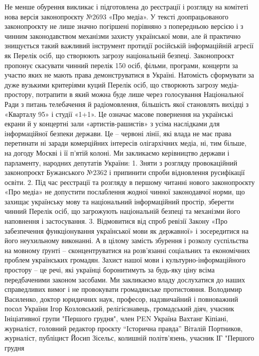 Не менше обурення викликає і підготовлена до реєстрації і розгляду на комітеті нова версія законопроєкту №2693 «Про медіа». У тексті доопрацьованого законопроєкту не лише значно погіршені порівняно з попередньою версією і з чинним законодавством механізми захисту української мови, але й практично знищується такий важливий інструмент протидії російській інформаційній агресії як Перелік осіб, що створюють загрозу національній безпеці.
Законопроєкт пропонує скасувати чинний перелік 150 осіб, фільми, програми, концерти за участю яких не мають права демонструватися в Україні. Натомість сформувати за дуже вузькими критеріями куций Перелік осіб, що створюють загрозу медіа-простору, потрапити в який можна буде лише через голосування Національної Ради з питань телебачення й радіомовлення, більшість якої становлять вихідці з «Кварталу 95» і студії «1+1». Це означає масове повернення на українські екрани й у концертні зали «артистів-рашистів» з усіма наслідками для інформаційної безпеки держави.
Це – червоні лінії, які влада не має права перетинати ні заради комерційних інтересів олігархічних медіа, ні, тим більше, на догоду Москві і її п’ятій колоні.
Ми закликаємо керівництво держави і парламенту, народних депутатів України:
1. Зняти з розгляду провокаційний законопроєкт Бужанського №2362 і припинити спроби відновлення русифікації освіти.
2. Під час реєстрації та розгляду в першому читанні нового законопроєкту «Про медіа» не допустити послаблення жодної чинної законодавчої норми, що захищає українську мову та національний інформаційний простір, зберегти чинний Перелік осіб, що загрожують національній безпеці та механізми його наповнення і застосування.
3. Відмовитися від спроб ревізії Закону «Про забезпечення функціонування української мови як державної» і зосередитися на його неухильному виконанні. А в цілому замість збурення і розколу суспільства на мовному ґрунті – сконцентруватися на розв’язанні соціальних та економічних проблем українських громадян.
Захист нашої мови і культурно-інформаційного простору – це речі, які українці боронитимуть за будь-яку ціну всіма передбаченими законом засобами. Ми закликаємо владу дослухатися до наших справедливих вимог і не провокувати громадянське протистояння.
Володимир Василенко, доктор юридичних наук, професор, надзвичайний і повноважний посол України
Ігор Козловський, релігієзнавець, громадський діяч, учасник Ініціативної групи "Першого грудня", член PEN Україна
Вахтанг Кіпіані, журналіст, головний редактор проєкту “Історична правда”
Віталій Портников, журналіст, публіцист
Йосип Зісельс, колишній політв'язень, учасник ІГ "Першого грудня
